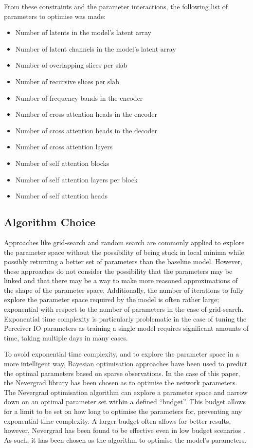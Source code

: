 \documentclass{l4proj}
\begin{document}
From these constraints and the parameter interactions, the following list of parameters to optimise was made:

\begin{itemize}
    \item{Number of latents in the model’s latent array}
    \item{Number of latent channels in the model’s latent array}
    \item{Number of overlapping slices per slab}
    \item{Number of recursive slices per slab}
    \item{Number of frequency bands in the encoder}
    \item{Number of cross attention heads in the encoder}
    \item{Number of cross attention heads in the decoder}
    \item{Number of cross attention layers}
    \item{Number of self attention blocks}
    \item{Number of self attention layers per block}
    \item{Number of self attention heads}
\end{itemize}

\subsection{Algorithm Choice}

Approaches like grid-search and random search are commonly applied to explore the parameter space without the possibility of being stuck in local minima while possibly returning a better set of parameters than the baseline model. However, these approaches do not consider the possibility that the parameters may be linked and that there may be a way to make more reasoned approximations of the shape of the parameter space. Additionally, the number of iterations to fully explore the parameter space required by the model is often rather large; exponential with respect to the number of parameters in the case of grid-search. Exponential time complexity is particularly problematic in the case of tuning the Perceiver IO parameters as training a single model requires significant amounts of time, taking multiple days in many cases.

To avoid exponential time complexity, and to explore the parameter space in a more intelligent way, Bayesian optimisation approaches have been used to predict the optimal parameters based on sparse observations. In the case of this paper, the Nevergrad library \citep{nevergrad} has been chosen as to optimise the network parameters. The Nevergrad optimisation algorithm can explore a parameter space and narrow down on an optimal parameter set within a defined “budget”. This budget allows for a limit to be set on how long to optimise the parameters for, preventing any exponential time complexity. A larger budget often allows for better results, however, Nevergrad has been found to be effective even in low budget scenarios \citep{rapin2019exploring}. As such, it has been chosen as the algorithm to optimise the model’s parameters.
\end{document}
